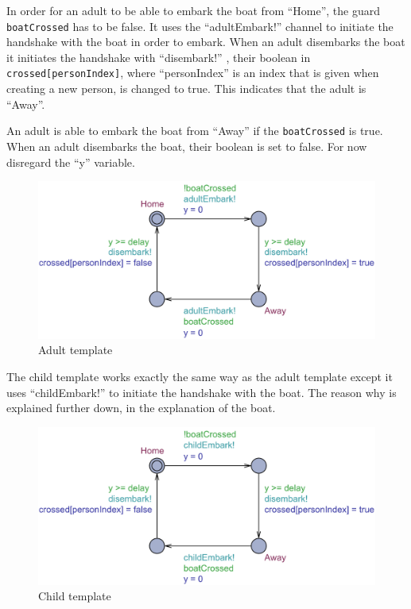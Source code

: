 \documentclass[a4paper,12pt]{article}
\begin{document}
In order for an adult to be able to embark the boat from ``Home'', the guard \lstinline|boatCrossed| has to be false.  It uses the ``adultEmbark!'' channel to initiate the handshake with the boat in order to embark. When an adult disembarks the boat it initiates the handshake with ``disembark!'' , their boolean in \lstinline|crossed[personIndex]|, where ``personIndex'' is an index that is given when creating a new person, is changed to true. This indicates that the adult is ``Away''. 

An adult is able to embark the boat from ``Away'' if the \lstinline|boatCrossed| is true. When an adult disembarks the boat, their boolean is set to false. For now disregard the ``y'' variable. 

\begin{figure}[H]
\centering
\includegraphics[width=\linewidth]{Adult.pdf}
\caption{Adult template}
\label{fig:adult}
\end{figure}

The child template works exactly the same way as the adult template except it uses ``childEmbark!'' to initiate the handshake with the boat. The reason why is explained further down, in the explanation of the boat.

\begin{figure}[H]
\centering
\includegraphics[width=\linewidth]{Child.pdf}
\caption{Child template}
\label{fig:child}
\end{figure}
\end{document}
